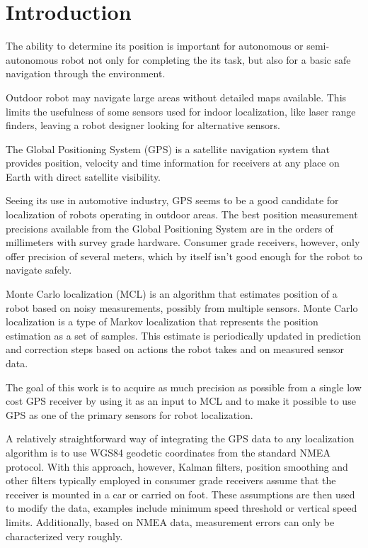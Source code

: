 \chapter{Introduction}


The ability to determine its position is important for autonomous or semi-autonomous robot
not only for completing the its task, but also for a basic
safe navigation through the environment.

Outdoor robot may navigate large areas without detailed maps available.
This limits
the usefulness of some sensors used for indoor localization, like laser range finders,
leaving a robot designer looking for alternative sensors.

The Global Positioning System (GPS) is a satellite navigation system that
provides position, velocity and time information for receivers at any place on Earth with direct
satellite visibility.

Seeing its use in automotive industry, GPS seems to be a good candidate for
localization of robots operating in outdoor areas.
The best position measurement precisions available from the Global Positioning System
are in the orders of millimeters with survey grade hardware.
Consumer grade receivers, however, only offer precision of several meters, which
by itself isn't good enough for the robot to navigate safely.


Monte Carlo localization (MCL) is an algorithm that estimates position of a robot
based on noisy measurements, possibly from multiple sensors.
Monte Carlo localization is a type of Markov localization that represents the position estimation as
a set of samples.
This estimate is periodically updated in prediction and correction steps based on
actions the robot takes and on measured sensor data.


\vspace{1.5em}

The goal of this work is to acquire as much precision as possible from a single low cost
GPS receiver by using it as an input to MCL and to make it possible to use
GPS as one of the primary sensors for robot localization.

A relatively straightforward way of integrating the GPS data to any localization algorithm is
to use WGS84 geodetic coordinates from the standard NMEA protocol.
With this approach, however, Kalman filters, position smoothing and other filters typically
employed in  consumer grade receivers assume that the receiver is mounted in a car or carried on foot.
These assumptions are then used to modify the data, examples
include minimum speed threshold or vertical speed limits.
Additionally, based on NMEA data, measurement errors can only be characterized very roughly.

